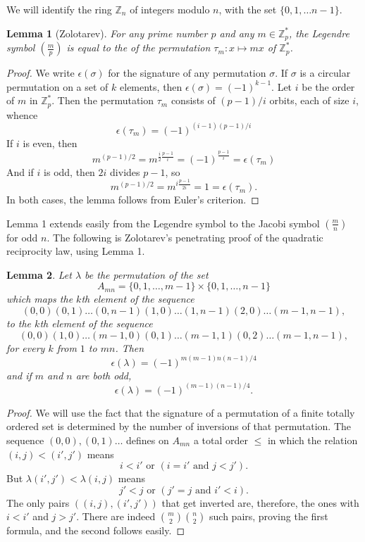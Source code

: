 \documentclass[12pt]{article}
\newtheorem{Lemma}{Lemma}
\newcommand{\legsym}[2]{\left(\frac{#1}{#2}\right)}
\newcommand{\Zpstar}{\mathbb{Z}_p^*}
\begin{document}
We will identify the ring $\mathbb{Z}_n$
of integers modulo $n$, with the set $\{0,1,\ldots n-1\}$.

\begin{Lemma}[Zolotarev] For any prime number $p$ and
any $m\in\Zpstar$, the Legendre symbol $\legsym{m}{p}$ is equal
to the  of the permutation $\tau_m:x\mapsto mx$ of $\Zpstar$.
\end{Lemma}
\begin{proof}
We write $\epsilon(\sigma)$ for the signature of any permutation $\sigma$. If $\sigma$ is a circular permutation on a set of $k$ elements, then $\epsilon(\sigma)=(-1)^{k-1}$.  Let $i$ be the order of $m$ in $\Zpstar$. Then the permutation $\tau_m$ consists of $(p-1)/i$ orbits, each of size $i$, whence
$$\epsilon(\tau_m)=(-1)^{(i-1)(p-1)/i}$$
If $i$ is even, then
$$m^{(p-1)/2}=m^{\frac{i}{2}\frac{p-1}{i}}=(-1)^{\frac{p-1}{i}}=\epsilon(\tau_m)$$
And if $i$ is odd, then $2i$ divides $p-1$, so
$$m^{(p-1)/2}=m^{i\frac{p-1}{2i}}=1=\epsilon(\tau_m).$$
In both cases, the lemma follows from Euler's criterion.
\end{proof}

Lemma 1 extends easily from the Legendre symbol to the Jacobi symbol $\left(\frac{m}{n}\right)$ for odd $n$.  The following is Zolotarev's penetrating proof of the quadratic reciprocity law, using Lemma 1.

\begin{Lemma} Let $\lambda$ be the permutation of the set
$$A_{mn}=\{0,1,\ldots,m-1\}\times \{0,1,\ldots,n-1\}$$
which maps the $k$th element of the sequence
$$(0,0)(0,1)\ldots(0,n-1)(1,0)\ldots(1,n-1)(2,0)\ldots(m-1,n-1),$$
to the $k$th element of the sequence
$$(0,0)(1,0)\ldots(m-1,0)(0,1)\ldots(m-1,1)(0,2)\ldots(m-1,n-1),$$
for every $k$ from $1$ to $mn$. Then
$$\epsilon(\lambda)=(-1)^{m(m-1)n(n-1)/4}$$
and if $m$ and $n$ are both odd,
$$\epsilon(\lambda)=(-1)^{(m-1)(n-1)/4}.$$
\end{Lemma}
\begin{proof}
We will use the fact that the signature of a permutation of
a finite totally ordered set is determined by the number of
inversions of that permutation.
The sequence $(0,0),(0,1)\ldots$
defines on $A_{mn}$ a total order $\le$
in which the relation $(i,j)<(i',j')$ means
$$i<i'\text{ or }(i=i'\text{ and }j<j').$$
But $\lambda(i',j')<\lambda(i,j)$ means
$$j'<j\text{ or }(j'=j\text{ and }i'<i).$$
The only pairs $((i,j),(i',j'))$ that get inverted are, therefore,
the ones with $i<i'$ and $j>j'$.
There are indeed $\binom{m}{2}\binom{n}{2}$
such pairs, proving the first formula, and the second follows easily.
\end{proof}
\end{document}
